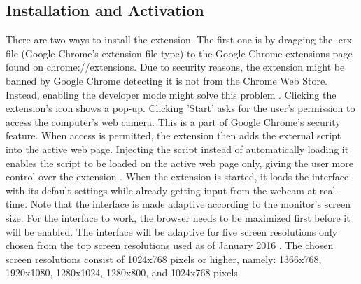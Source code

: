\documentclass[journal]{./IEEE/IEEEtran}
\begin{document}
\subsection {Installation and Activation}
There are two ways to install the extension. The first one is by dragging the .crx file (Google Chrome’s extension file type) to the Google Chrome extensions page found on chrome://extensions. Due to security reasons, the extension might be banned by Google Chrome   detecting it is not from the Chrome Web Store. Instead, enabling the developer mode might solve this problem \cite{ chrome_ext_2014 }.
Clicking the extension's icon  shows a pop-up. Clicking 'Start'  asks for the user's permission to access  the computer's web camera. This is a part of Google Chrome's security feature. When access is permitted, the extension  then adds the external script into the active web page. Injecting the script instead of automatically loading it enables the script to be loaded on the active web page only, giving the user more control over the extension \cite{ dimacali_danila_2016}  \cite{giant_robots_2015} \cite{ marcus_2015 }.
When the extension is started, it loads the interface with its default settings while already getting input from the webcam at real-time. Note that the interface is made adaptive according to the monitor’s screen size. For the interface to work, the browser needs to be maximized first before it will be enabled. The interface will be adaptive for five screen resolutions only chosen from the top screen resolutions used as of January 2016 \cite{w3counter_global_web_stats}. The chosen screen resolutions consist of 1024x768 pixels or higher, namely: 1366x768, 1920x1080, 1280x1024, 1280x800, and 1024x768 pixels. 
\end{document}
